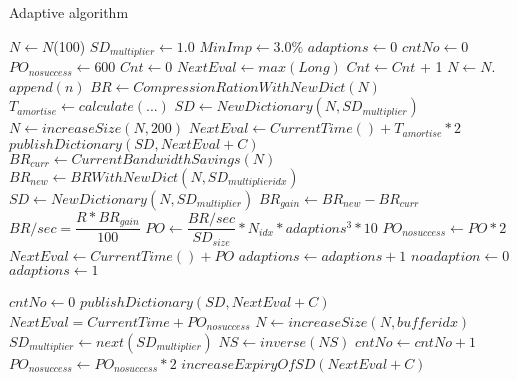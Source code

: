 \begin{algorithm}[!ht]
\caption{Adaptive algorithm}\label{algo:adaptive}
\begin{algorithmic}[1]
\State $N \gets N$(100) 
\State $SD_{multiplier} \gets 1.0$ 
\State $MinImp \gets 3.0\%$
\State $adaptions \gets 0$ 
\State $cntNo \gets 0$ 
\State $PO_{nosuccess} \gets 600$ 
\State $Cnt \gets 0$ 
\State $NextEval \gets max(Long)$ 
		\State $Cnt \gets Cnt$ + 1 
		\State $N \gets N$.$append(n)$ 
		 
			\State $BR \gets CompressionRationWithNewDict(N)$ 
			\State $T_{amortise} \gets calculate(...)$ 
			\State $SD \gets NewDictionary(N,SD_{multiplier})$ 
			\State $N \gets increaseSize(N,200)$ 
			\State $NextEval \gets CurrentTime() + T_{amortise} * 2$ 
			\State $publishDictionary(SD,NextEval + C)$ 
		\EndIf
			\State $BR_{curr} \gets CurrentBandwidthSavings(N)$ 
			\State $BR_{new} \gets BRWithNewDict(N,SD_{multiplieridx})$ 
				\State $SD \gets NewDictionary(N,SD_{multiplier})$ 
				\State $BR_{gain} \gets BR_{new} - BR_{curr}$ 
				\State $BR/sec = \dfrac {R * BR_{gain}}{100}$ 
				\State $PO \gets \dfrac {BR/sec}{SD_{size}} * N_{idx} * adaptions^{3} * 10$ 
				\State $PO_{nosuccess} \gets PO * 2$ 
				\State $NextEval \gets CurrentTime() + PO$ 
				\State $adaptions \gets adaptions + 1$ 
				\State $noadaption \gets 0$ 
					\State $adaptions \gets 1$ 
\end{algorithmic}
\end{algorithm}


\begin{algorithm}[!ht]
\begin{algorithmic}[1]
				\EndIf
				\State $cntNo \gets 0$ 
				\State $publishDictionary(SD,NextEval + C)$ 
			\Else
				\State $NextEval = CurrentTime + PO_{nosuccess}$ 
				 
					\State $N \gets increaseSize(N,bufferidx)$
								 
					\State $SD_{multiplier} \gets next(SD_{multiplier})$ 
				\EndIf
								\State $NS \gets inverse(NS)$ 
				\State $cntNo \gets cntNo + 1$ 
				\State $PO_{nosuccess} \gets PO_{nosuccess} * 2$ 
				\State $increaseExpiryOfSD(NextEval + C)$ 
			\EndIf
		\EndIf	
	\EndWhile
\EndFunction

\end{algorithmic}
\end{algorithm}

